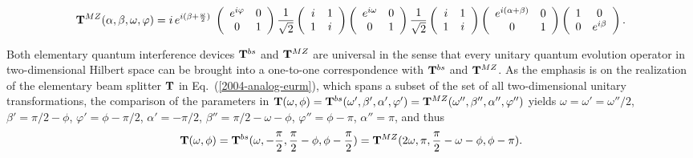 \documentclass[pra,showpacs,showkeys,amsfonts]{revtex4}
\begin{document}
\begin{equation}
{\bf T}^{MZ} (\alpha ,\beta ,\omega ,\varphi )=
i \, e^{i(\beta +{\omega \over 2})}\;
\left(
\begin{array}{cc}
e^{i\varphi }& 0\\
0& 1
 \end{array}
\right)
{1\over \sqrt{2}}\left(
\begin{array}{cc}
i& 1\\
1& i
 \end{array}
\right)
\left(
\begin{array}{cc}
e^{i\omega}& 0\\
0&1
 \end{array}
\right)
{1\over \sqrt{2}}\left(
\begin{array}{cc}
i& 1\\
1& i
 \end{array}
\right)
\left(
\begin{array}{cc}
e^{i(\alpha+\beta )}& 0\\
0&1
 \end{array}
\right)
\left(
\begin{array}{cc}
1& 0\\
0& e^{i\beta}
 \end{array}
\right)
 .
\label{e:quid2mm}
\end{equation}



Both elementary quantum interference devices
${\bf T}^{bs}$
and
${\bf T}^{MZ}$
are  universal in the
sense that
 every unitary quantum
evolution operator in two-dimensional Hilbert space can be brought into a
one-to-one correspondence with
${\bf T}^{bs}$
and
${\bf T}^{MZ}$.
As the emphasis is on the realization of the elementary beam splitter
${\bf T}$ in Eq.~(\ref{2004-analog-eurm}),
which spans a subset of the set of all two-dimensional unitary transformations,
the comparison of the parameters in
${\bf T}(\omega ,\phi )=
{\bf T}^{bs}(\omega ',\beta ',\alpha ',\varphi ')=
{\bf T}^{MZ}(\omega '',\beta '',\alpha '',\varphi '')$
yields
$\omega =\omega' =\omega''/2$,
$\beta'=\pi /2 -\phi$,
$\varphi'=\phi-\pi /2$,
$\alpha'=-\pi /2$,
$\beta''=\pi /2 - \omega -\phi$,
$\varphi''=\phi - \pi $,
$\alpha''=\pi $,
and thus
\begin{equation}
{\bf T} (\omega ,\phi ) =
{\bf T}^{bs} (\omega ,- {\pi \over 2 },{\pi \over 2} -\phi ,\phi-{\pi \over  2} ) =
{\bf T}^{MZ} (2\omega ,\pi  ,{\pi \over 2} - \omega -\phi ,\phi - \pi  )
.
\end{equation}
\end{document}
